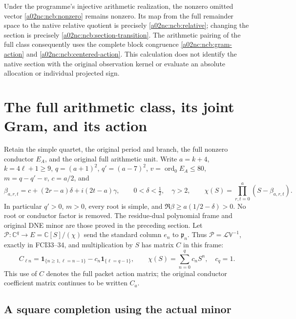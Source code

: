 Under the programme's injective arithmetic realization, the nonzero
omitted vector \eqref{a02nc:ncb:nonzero} remains nonzero. Its map from the
full remainder space to the native relative quotient is precisely
\eqref{a02nc:ncb:relative}; changing the section is precisely
\eqref{a02nc:ncb:section-transition}. The arithmetic pairing of the full
class consequently uses the complete block congruence
\eqref{a02nc:ncb:gram-action} and \eqref{a02nc:ncb:centered-action}.
This calculation does not identify the native section with the
original observation kernel or evaluate an absolute allocation or
individual projected sign.


\section{The full arithmetic class, its joint Gram, and its action}

Retain the simple quartet, the original period and branch, the full
nonzero conductor $E_A$, and the original full arithmetic unit.
Write $a=k+4$, $k=4\ell+1\ge9$,
$q=(a+1)^2$, $q'=(a-7)^2$, $v=\operatorname{ord}_0E_A\le80$,
$m=q-q'-v$, $c=a/2$, and
\[
 \beta_{a,r,t}=c+(2r-a)\delta+i(2t-a)\gamma,\qquad
 0<\delta<\tfrac12,\quad \gamma>2,\qquad
 \chi(S)=\prod_{r,t=0}^{a}(S-\beta_{a,r,t}).
 \tag{NCRP1}
\]
In particular $q'>0$, $m>0$, every root is simple, and
$\Re\beta\ge a(1/2-\delta)>0$. No root or conductor factor is
removed. The residue-dual polynomial frame and original DNE minor
are those proved in the preceding section. Let
$\mathscr P:\mathbb C^q\to E=\mathbb C[S]/(\chi)$ send the standard
column $e_n$ to $\mathfrak p_n$.
Thus $\mathscr P=\mathcal L\mathbb V^{-1}$, exactly in FCI33--34,
and multiplication by $S$ has matrix $C$ in this frame:
\[
 C_{\ell n}=\mathbf1_{\{n\ge1,\ell=n-1\}}
              -c_n\mathbf1_{\{\ell=q-1\}},\qquad
 \chi(S)=\sum_{n=0}^{q}c_nS^n,\quad c_q=1.
 \tag{NCRP2}
\]
This use of $C$ denotes the full packet action matrix; the original
conductor coefficient matrix continues to be written $C_a$.

\subsection{A square completion using the actual minor}

